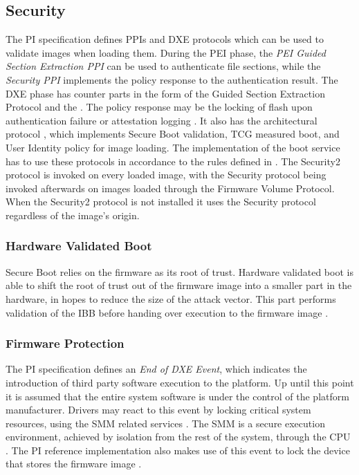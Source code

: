 
\subsection{Security}
\label{sec:uefi-pi:pi:security}

The \ac{PI} specification defines \acp{PPI} and \ac{DXE} protocols which can be used to validate images when loading them.
During the \ac{PEI} phase, the \emph{\ac{PEI} Guided Section Extraction \ac{PPI}} can be used to authenticate file sections, while the \emph{Security \ac{PPI}} implements the policy response to the authentication result.
The \ac{DXE} phase has counter parts in the form of the Guided Section Extraction Protocol and the .
The policy response may be the locking of flash upon authentication failure or attestation logging \cite[Vol. 2, Section 12.9.1]{pi-spec}.
It also has the architectural protocol , which implements Secure Boot validation, \ac{TCG} measured boot, and User Identity policy for image loading.
The implementation of the boot service  has to use these protocols in accordance to the rules defined in \cite[Vol. 2, Section 12.9.2]{pi-spec}.
The Security2 protocol is invoked on every loaded image, with the Security protocol being invoked afterwards on images loaded through the Firmware Volume Protocol.
When the Security2 protocol is not installed it uses the Security protocol regardless of the image's origin.

\subsubsection{Hardware Validated Boot}

Secure Boot relies on the firmware as its root of trust.
Hardware validated boot is able to shift the root of trust out of the firmware image into a smaller part in the hardware, in hopes to reduce the size of the attack vector.
This part performs validation of the \ac{IBB} before handing over execution to the firmware image \cite{tianocore-understanding-uefi-secure-boot-chain}.

\subsubsection{Firmware Protection}

The \ac{PI} specification defines an \emph{End of \acs{DXE} Event}, which indicates the introduction of third party software execution to the platform.
Up until this point it is assumed that the entire system software is under the control of the platform manufacturer.
Drivers may react to this event by locking critical system resources, using the \ac{SMM} related services \cite[Vol. 2, 5.1.2.1]{pi-spec}.
The \ac{SMM} is a secure execution environment, achieved by isolation from the rest of the system, through the \ac{CPU} \cite[Vol. 4, Section 1.3]{pi-spec}.
The \ac{PI} reference implementation also makes use of this event to lock the device that stores the firmware image \cite{tianocore-edk2-fmpdxe}.
